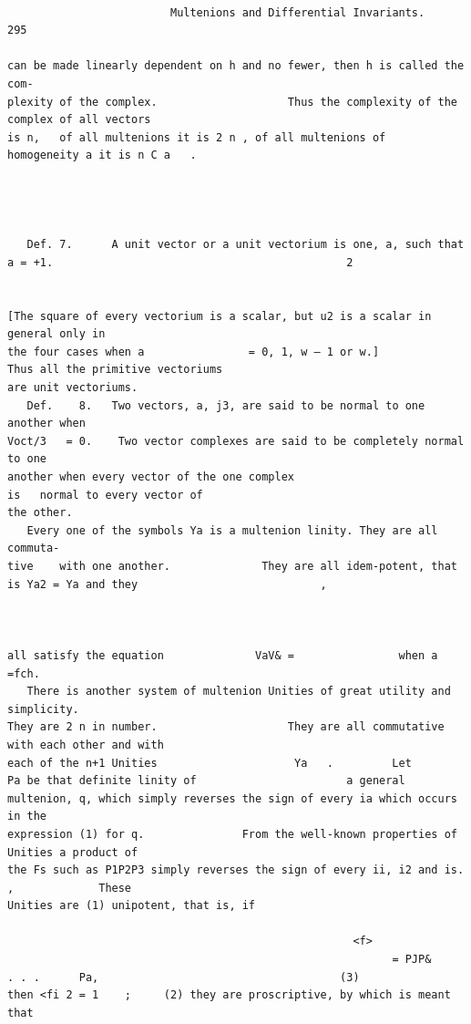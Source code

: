 \documentclass[10pt]{article}
\begin{document}
\begin{verbatim}

                         Multenions and Differential Invariants.                                                                295

can be made linearly dependent on h and no fewer, then h is called the com-
plexity of the complex.                    Thus the complexity of the complex of all vectors
is n,   of all multenions it is 2 n , of all multenions of                                            homogeneity a it is n C a   .




   Def. 7.      A unit vector or a unit vectorium is one, a, such that a = +1.                                             2


[The square of every vectorium is a scalar, but u2 is a scalar in general only in
the four cases when a                = 0, 1, w — 1 or w.]                                Thus all the primitive vectoriums
are unit vectoriums.
   Def.    8.   Two vectors, a, j3, are said to be normal to one another when
Voct/3   = 0.    Two vector complexes are said to be completely normal to one
another when every vector of the one complex                                                     is   normal to every vector of
the other.
   Every one of the symbols Ya is a multenion linity. They are all commuta-
tive    with one another.              They are all idem-potent, that is Ya2 = Ya and they                            ,



all satisfy the equation              VaV& =                when a =fch.
   There is another system of multenion Unities of great utility and simplicity.
They are 2 n in number.                    They are all commutative with each other and with
each of the n+1 Unities                     Ya   .         Let        Pa be that definite linity of                       a general
multenion, q, which simply reverses the sign of every ia which occurs in the
expression (1) for q.               From the well-known properties of Unities a product of
the Fs such as P1P2P3 simply reverses the sign of every ii, i2 and is.                                           ,             These
Unities are (1) unipotent, that is, if

                                                     <f>
                                                           = PJP&              . . .      Pa,                                     (3)
then <fi 2 = 1    ;     (2) they are proscriptive, by which is meant that


\end{verbatim}
\end{document}
